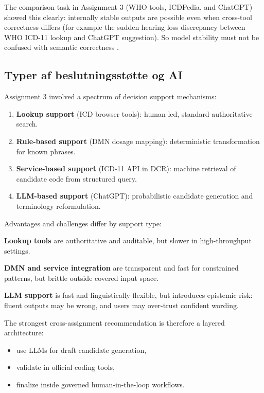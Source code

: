 The comparison task in Assignment 3 (WHO tools, ICDPedia, and ChatGPT) showed this clearly: internally stable outputs are possible even when cross-tool correctness differs (for example the sudden hearing loss discrepancy between WHO ICD-11 lookup and ChatGPT suggestion). So model stability must not be confused with semantic correctness \parencite{who2019icd10browser,who2024icd11codingtool,coiera2015ch23}.

\subsection{Typer af beslutningsstøtte og AI}
\label{subsec:kodning_beslutningsstoette_ai}

Assignment 3 involved a spectrum of decision support mechanisms:
\begin{enumerate}
    \item \textbf{Lookup support} (ICD browser tools): human-led, standard-authoritative search.
    \item \textbf{Rule-based support} (DMN dosage mapping): deterministic transformation for known phrases.
    \item \textbf{Service-based support} (ICD-11 API in DCR): machine retrieval of candidate code from structured query.
    \item \textbf{LLM-based support} (ChatGPT): probabilistic candidate generation and terminology reformulation.
\end{enumerate}

Advantages and challenges differ by support type:

\textbf{Lookup tools} are authoritative and auditable, but slower in high-throughput settings.

\textbf{DMN and service integration} are transparent and fast for constrained patterns, but brittle outside covered input space.

\textbf{LLM support} is fast and linguistically flexible, but introduces epistemic risk: fluent outputs may be wrong, and users may over-trust confident wording.

The strongest cross-assignment recommendation is therefore a layered architecture:
\begin{itemize}
    \item use LLMs for draft candidate generation,
    \item validate in official coding tools,
    \item finalize inside governed human-in-the-loop workflows.
\end{itemize}

